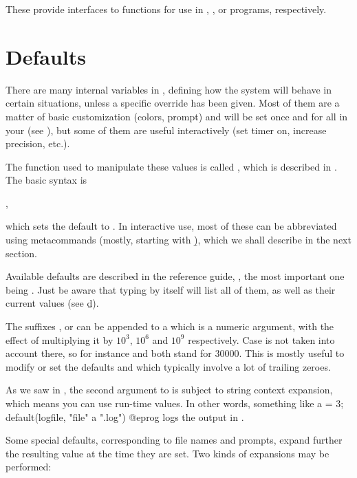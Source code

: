 These provide interfaces to  functions for use in
, , or 
programs, respectively.

\section{Defaults}
\label{se:defaults}

\noindent There are many internal variables in , defining how the
system will behave in certain situations, unless a specific override has been
given. Most of them are a matter of basic customization (colors, prompt) and
will be set once and for all in your  (see
), but some of them are useful interactively (set timer on,
increase precision, etc.).

The function used to manipulate these values is called , which
is described in . The basic syntax is

,

\noindent which sets the default  to . In interactive
use, most of these can be abbreviated using  metacommands
(mostly, starting with \b), which we shall describe in the next section.

Available defaults are described in the reference guide,
, the most important one being .
Just be aware that typing  by itself will list all of them, as
well as their current values (see \b{d}).

 The suffixes ,  or  can be appended to
a  which is a numeric argument, with the effect of multiplying it
by $10^3$, $10^6$ and $10^9$ respectively. Case is not taken into account
there, so for instance  and  both stand for $30000$. This
is mostly useful to modify or set the defaults  and
 which typically involve a lot of trailing zeroes.

 As we saw in ,
the second argument to  is subject to string context
expansion, which means you can use run-time values. In other words, something
like
\bprog
  a = 3;
  default(logfile, "file" a ".log")
@eprog
logs the output in .

Some special defaults, corresponding to file names and prompts, expand further
the resulting value at the time they are set. Two kinds of expansions may be
performed:

